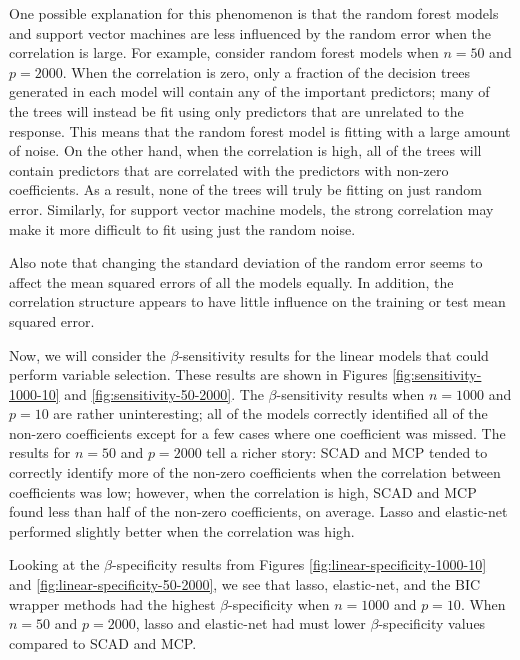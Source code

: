 \documentclass{article}
\begin{document}
	One possible explanation for this phenomenon is that the random forest models and support vector machines are less influenced by the random error when the correlation is large. For example, consider random forest models when $n = 50$ and $p = 2000$. When the correlation is zero, only a fraction of the decision trees generated in each model will contain any of the important predictors; many of the trees will instead be fit using only predictors that are unrelated to the response. This means that the random forest model is fitting with a large amount of noise. On the other hand, when the correlation is high, all of the trees will contain predictors that are correlated with the  predictors with non-zero coefficients. As a result, none of the trees will truly be fitting on just random error. Similarly, for support vector machine models, the strong correlation may make it more difficult to fit using just the random noise.
	
	Also note that changing the standard deviation of the random error seems to affect the mean squared errors of all the models equally. In addition, the correlation structure appears to have little influence on the training or test mean squared error.
	
	Now, we will consider the $\beta$-sensitivity results for the linear models that could perform variable selection. These results are shown in Figures \ref{fig:sensitivity-1000-10} and \ref{fig:sensitivity-50-2000}. The $\beta$-sensitivity results when $n = 1000$ and $p = 10$ are rather uninteresting; all of the models correctly identified all of the non-zero coefficients except for a few cases where one coefficient was missed. The results for $n = 50$ and $p = 2000$ tell a richer story: SCAD and MCP tended to correctly identify more of the non-zero coefficients when the correlation between coefficients was low; however, when the correlation is high, SCAD and MCP found less than half of the non-zero coefficients, on average. Lasso and elastic-net performed slightly better when the correlation was high.
	
	Looking at the $\beta$-specificity results from Figures \ref{fig:linear-specificity-1000-10} and \ref{fig:linear-specificity-50-2000}, we see that lasso, elastic-net, and the BIC wrapper methods had the highest $\beta$-specificity when $n = 1000$ and $p = 10$. When $n = 50$ and $p = 2000$, lasso and elastic-net had must lower $\beta$-specificity values compared to SCAD and MCP.
	
\end{document}
